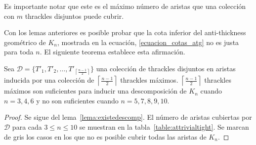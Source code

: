 Es importante notar que este es el máximo número de aristas que una colección
con $m$ thrackles disjuntos puede cubrir.

Con los lemas anteriores es posible probar que la cota inferior del
anti-thickness geométrico de $K_n$, mostrada en la ecuación,
\ref{ecuacion_cotas_atg} no es justa para toda $n$. El siguiente teorema
establece esta afirmación.
\begin{theorem}\label{teo:cotainf}
Sea $\mathcal{D}=\{T'_1,T'_2,\dots,T'_{\left\lceil\frac{n-1}{2}\right\rceil}\}$
una colección de thrackles disjuntos en aristas inducida por una colección de
$\left\lceil\frac{n-1}{2}\right\rceil$ thrackles máximos.
$\left\lceil\frac{n-1}{2}\right\rceil$ thrackles máximos son
suficientes para inducir una descomposición de $K_n$ cuando $n={3,4,6}$ y no son suficientes cuando $n={5,7,8,9,10}$.
\end{theorem}
\begin{proof}
  Se sigue del lema~\ref{lema:existedescomp}. El número de aristas cubiertas
  por $\mathcal{D}$ para cada $3\leq n \leq 10$ se muestran en la
  tabla~\ref{table:attrivialtight}. Se marcan de gris los casos en los que no es
  posible cubrir todas las aristas de $K_n$.
\end{proof}

